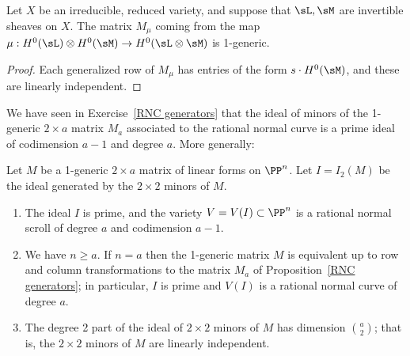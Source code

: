\begin{proposition}\label{some generators}
Let $X$ be
an irreducible, reduced variety, and suppose that $\sL,\sM$ are invertible sheaves on $X$.
The matrix $M_\mu$ coming from the map $\mu:H^0(\sL) \otimes H^0(\sM) \to H^0(\sL\otimes \sM)$
is 1-generic. 
\end{proposition}

\begin{proof} Each generalized row of $M_\mu$ has entries of the form $s\cdot H^0(\sM)$,
and these are linearly independent.
\end{proof}

We have seen in Exercise~\ref{RNC generators} that the ideal of minors of the 1-generic $2\times a$ matrix $M_{a}$ associated to the rational normal curve is a prime ideal of codimension $a-1$ and degree $a$. More generally:

\begin{theorem}\label{1-generic basics} Let $M$ be a 1-generic $2\times a$ matrix of linear forms on $\PP^n$. 
Let $I = I_2(M)$  be the ideal generated by the $2\times 2$ minors of $M$.
 \begin{enumerate}

\item The ideal $I$ is
prime, and the variety $V = V(I) \subset \PP^n$ is a  rational normal scroll of degree $a$ and codimension $a-1$.

\item We have $n\geq a$. If $n = a$ then the 1-generic matrix
$M$ is equivalent up to row and column transformations to the matrix $M_{a}$ of Proposition~\ref{RNC generators};
in particular, $I$ is prime and $V(I)$ is a rational normal
curve of degree $a$.

\item The degree 2 part of the ideal of $2\times 2$ minors of $M$ has dimension ${a\choose 2}$; that is, the $2\times 2$ minors of $M$ are linearly independent.
\end{enumerate}
\end{theorem}

